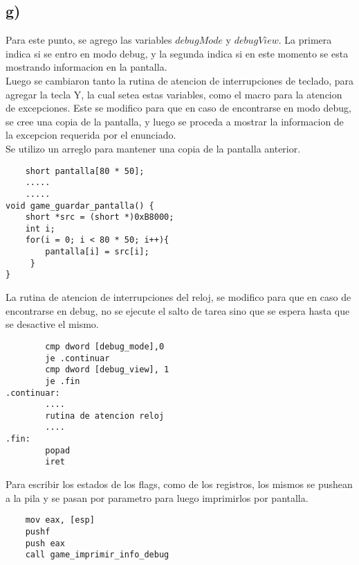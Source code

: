 \subsection*{g)}

\noindent Para este punto, se agrego las variables $debugMode$ y $debugView$. La primera indica si se entro en modo debug, y la segunda indica si en este momento se esta mostrando informacion en la pantalla. \\

\noindent Luego se cambiaron tanto la rutina de atencion de interrupciones de teclado, para agregar la tecla Y, la cual setea estas variables, como el macro para la atencion de excepciones. Este se modifico para que en caso de encontrarse en modo debug, se cree una copia de la pantalla, y luego se proceda a mostrar la informacion de la excepcion requerida por el enunciado. \\

\noindent Se utilizo un arreglo para mantener una copia de la pantalla anterior.

\begin{codesnippet}
\begin{verbatim}
    short pantalla[80 * 50];
    .....
    .....
void game_guardar_pantalla() {
    short *src = (short *)0xB8000;
    int i;
    for(i = 0; i < 80 * 50; i++){
        pantalla[i] = src[i];
     }
}
\end{verbatim}
\end{codesnippet}

\noindent La rutina de atencion de interrupciones del reloj, se modifico para que en caso de encontrarse en debug, no se ejecute el salto de tarea sino que se espera hasta que se desactive el mismo.
\begin{codesnippet}
\begin{verbatim}
        cmp dword [debug_mode],0
        je .continuar
        cmp dword [debug_view], 1
		je .fin
.continuar:
        ....
        rutina de atencion reloj
        ....
.fin:
        popad  
        iret
\end{verbatim}
\end{codesnippet}

\noindent Para escribir los estados de los flags, como de los registros, los mismos se pushean a la pila y se pasan por parametro para luego imprimirlos por pantalla.

\begin{codesnippet}
\begin{verbatim}
    mov eax, [esp]
    pushf 									
    push eax
    call game_imprimir_info_debug
\end{verbatim}
\end{codesnippet}
